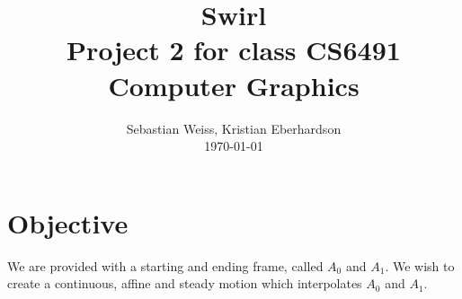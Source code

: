 \documentclass[journal, letterpaper]{IEEEtran}
\begin{document}
\title{Swirl\\
	{\large Project 2 for class CS6491 Computer Graphics}}
\author{Sebastian Weiss, Kristian Eberhardson\\ \today}

\maketitle


\section{Objective}
We are provided with a starting and ending frame, called $A_0$ and $A_1$. We wish to create a continuous, affine and steady motion which interpolates $A_0$ and $A_1$.
 
\end{document}
